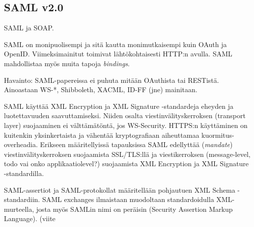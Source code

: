 \documentclass[finnish,gradu]{tktltiki}
\begin{document}




  \subsection{SAML v2.0} %
  \label{sub:saml_v2_0}
  SAML ja SOAP.

  SAML on monipuolisempi ja sitä kautta monimutkaisempi kuin OAuth ja OpenID. Viimeksimainitut toimivat lähtökohtaisesti HTTP:n avulla. SAML mahdollistaa myös muita tapoja \emph{bindings}.

  Havainto: SAML-papereissa ei puhuta mitään OAuthista tai RESTistä. Ainoastaan WS-*, Shibboleth, XACML, ID-FF (jne) mainitaan.

  SAML käyttää XML Encryption ja XML Signature -standardeja eheyden ja luotettavuuden saavuttamiseksi.
  Niiden osalta viestinvälityskerroksen (transport layer) suojaaminen ei välttämätöntä, jos WS-Security.
  HTTPS:n käyttäminen on kuitenkin yksinkertaista ja vähentää kryptografiaan aiheuttamaa kuormitus-overheadia.
  Erikseen määritellyissä tapauksissa SAML edellyttää (\emph{mandate}) viestinvälityskerroksen suojaamista SSL/TLS:llä ja viestikerroksen (message-level, todo vai onko applikaatiolevel?) suojaamista XML Encryption ja XML Signature -standardilla.

  SAML-assertiot ja SAML-protokollat määritellään pohjautuen XML Schema -standardiin.
  SAML exchanges ilmaistaan muodoltaan standardoidulla XML-murteella, josta myös SAMLin nimi on peräisin (Security Assertion Markup Language). (viite
\end{document}
